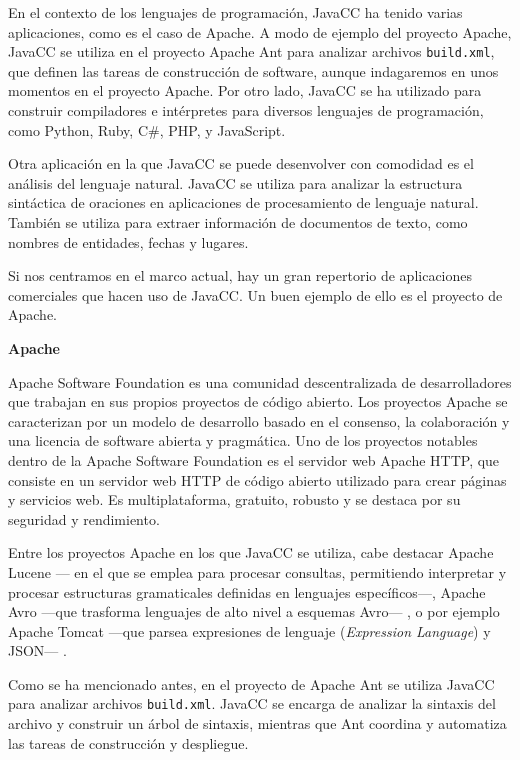 En el contexto de los lenguajes de programación, JavaCC ha tenido varias aplicaciones, como es el caso de Apache. A modo de ejemplo del proyecto Apache, JavaCC se utiliza en el proyecto Apache Ant para analizar archivos  \lstinline|build.xml|, que definen las tareas de construcción de software\cite{apache}, aunque indagaremos en unos momentos en el proyecto Apache. Por otro lado, JavaCC se ha utilizado para construir compiladores e intérpretes para diversos lenguajes de programación, como Python, Ruby, C\#, PHP, y JavaScript\cite{javaccc++preprocessor}.

Otra aplicación en la que JavaCC se puede desenvolver con comodidad es el análisis del lenguaje natural. JavaCC se utiliza para analizar la estructura sintáctica de oraciones en aplicaciones de procesamiento de lenguaje natural\cite{languageprocessing}. También se utiliza para extraer información de documentos de texto, como nombres de entidades, fechas y lugares.

Si nos centramos en el marco actual, hay un gran repertorio de aplicaciones comerciales que hacen uso de JavaCC. Un buen ejemplo de ello es el proyecto de Apache.

\phantom{text}

\noindent \textbf{Apache}

\phantom{text}

\noindent Apache Software Foundation es una comunidad descentralizada de desarrolladores que trabajan en sus propios proyectos de código abierto. Los proyectos Apache se caracterizan por un modelo de desarrollo basado en el consenso, la colaboración y una licencia de software abierta y pragmática\cite{apachepaginaoficial}. Uno de los proyectos notables dentro de la Apache Software Foundation es el servidor web Apache HTTP, que consiste en un servidor web HTTP de código abierto utilizado para crear páginas y servicios web. Es multiplataforma, gratuito, robusto y se destaca por su seguridad y rendimiento\cite{apachehttp}.

Entre los proyectos Apache en los que JavaCC se utiliza, cabe destacar Apache Lucene --- en el que se emplea para procesar consultas, permitiendo interpretar y procesar estructuras gramaticales definidas en lenguajes específicos---, Apache Avro ---que trasforma lenguajes de alto nivel a esquemas Avro--- , o por ejemplo Apache Tomcat ---que parsea expresiones de lenguaje (\textit{Expression Language})\cite{expressionlanguage} y JSON--- \cite{javaccgithub}.

Como se ha mencionado antes, en el proyecto de Apache Ant se utiliza JavaCC para analizar archivos \lstinline|build.xml|. JavaCC se encarga de analizar la sintaxis del archivo y construir un árbol de sintaxis, mientras que Ant coordina y automatiza las tareas de construcción y despliegue.

